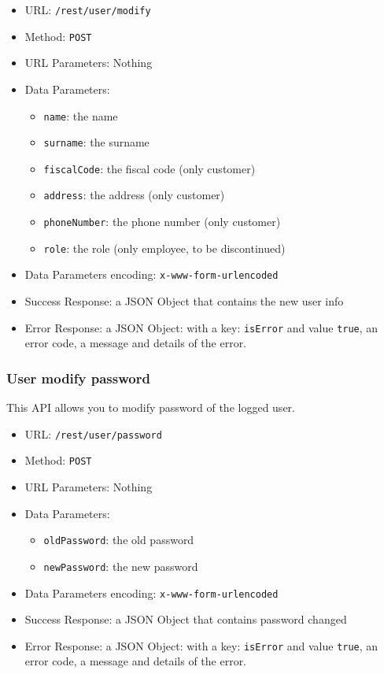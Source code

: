 \begin{itemize}
    \item URL: \texttt{/rest/user/modify}
    \item Method: \texttt{POST}
    \item URL Parameters: Nothing
    \item Data Parameters:
    \begin{itemize}
        \item \texttt{name}: the name
        \item \texttt{surname}: the surname
        \item \texttt{fiscalCode}: the fiscal code (only customer)
        \item \texttt{address}: the address (only customer)
        \item \texttt{phoneNumber}: the phone number (only customer)
        \item \texttt{role}: the role (only employee, to be discontinued)
    \end{itemize}
    \item Data Parameters encoding: \texttt{x-www-form-urlencoded}
    \item Success Response: a JSON Object that contains the new user info
    \item Error Response: a JSON Object: with a key: \texttt{isError}  and value \texttt{true}, an error code, a message and details of the error.
\end{itemize}

\subsubsection*{User modify password}

This API allows you to modify password of the logged user.

\begin{itemize}
    \item URL: \texttt{/rest/user/password}
    \item Method: \texttt{POST}
    \item URL Parameters: Nothing
    \item Data Parameters:
    \begin{itemize}
        \item \texttt{oldPassword}: the old password
        \item \texttt{newPassword}: the new password
    \end{itemize}
    \item Data Parameters encoding: \texttt{x-www-form-urlencoded}
    \item Success Response: a JSON Object that contains password changed
    \item Error Response: a JSON Object: with a key: \texttt{isError}  and value \texttt{true}, an error code, a message and details of the error.
\end{itemize}



